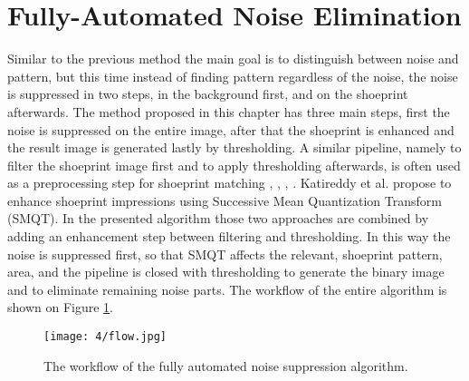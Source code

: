 \documentclass[draft,final]{vutinfth} %
\begin{document}
\section{Fully-Automated Noise Elimination}

\par
Similar to the previous method the main goal is to distinguish between noise and pattern, but this time instead of finding pattern regardless of the noise, the noise is suppressed in two steps, in the background first, and on the shoeprint afterwards.
The method proposed in this chapter has three main steps, first the noise is suppressed on the entire image, after that the shoeprint is enhanced and the result image is generated lastly by thresholding.
A similar pipeline, namely to filter the shoeprint image first and to apply thresholding afterwards, is  often used as a preprocessing step for shoeprint matching \cite{alizadeh2017automatic}, \cite{wang2014automatic}, \cite{li2014retrieval}, \cite{kong2014novel}.
Katireddy et al. \cite{katireddy2017novel} propose to enhance shoeprint impressions using Successive Mean Quantization Transform (SMQT).
In the presented algorithm those two approaches are combined by adding an enhancement step between filtering and thresholding.
In this way the noise is suppressed first, so that SMQT affects the relevant, shoeprint pattern, area, and the pipeline is closed with thresholding to generate the binary image and to eliminate remaining noise parts.
The workflow of the entire algorithm is shown on Figure \ref{fig:fans:workflow}.

\begin{figure}[h]
  \centering
  \texttt{[image: 4/flow.jpg]}
  \caption{The workflow of the fully automated noise suppression algorithm.}
  \label{fig:fans:workflow} %
\end{figure}
\end{document}
